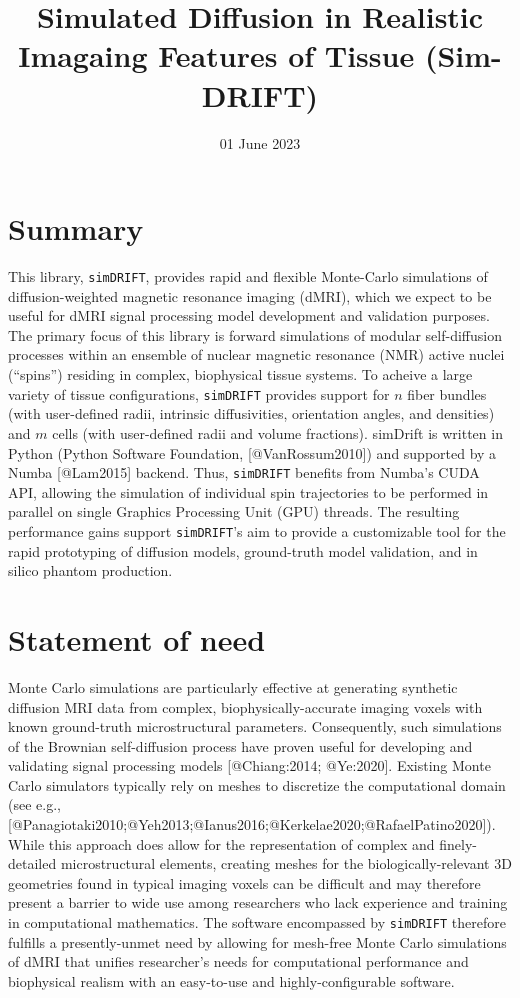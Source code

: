 \documentclass[
]{article}
\title{Simulated Diffusion in Realistic Imagaing Features of Tissue
(Sim-DRIFT)}
\author{}
\date{01 June 2023}
\begin{document}
\maketitle

\hypertarget{summary}{%
\section{Summary}\label{summary}}

This library, \texttt{simDRIFT}, provides rapid and flexible Monte-Carlo
simulations of diffusion-weighted magnetic resonance imaging (dMRI),
which we expect to be useful for dMRI signal processing model
development and validation purposes. The primary focus of this library
is forward simulations of modular self-diffusion processes within an
ensemble of nuclear magnetic resonance (NMR) active nuclei (``spins'')
residing in complex, biophysical tissue systems. To acheive a large
variety of tissue configurations, \texttt{simDRIFT} provides support for
\(n\) fiber bundles (with user-defined radii, intrinsic diffusivities,
orientation angles, and densities) and \(m\) cells (with user-defined
radii and volume fractions). simDrift is written in Python (Python
Software Foundation, {[}@VanRossum2010{]}) and supported by a Numba
{[}@Lam2015{]} backend. Thus, \texttt{simDRIFT} benefits from Numba's
CUDA API, allowing the simulation of individual spin trajectories to be
performed in parallel on single Graphics Processing Unit (GPU) threads.
The resulting performance gains support \texttt{simDRIFT}'s aim to
provide a customizable tool for the rapid prototyping of diffusion
models, ground-truth model validation, and in silico phantom production.

\hypertarget{statement-of-need}{%
\section{Statement of need}\label{statement-of-need}}

Monte Carlo simulations are particularly effective at generating
synthetic diffusion MRI data from complex, biophysically-accurate
imaging voxels with known ground-truth microstructural parameters.
Consequently, such simulations of the Brownian self-diffusion process
have proven useful for developing and validating signal processing
models {[}@Chiang:2014; @Ye:2020{]}. Existing Monte Carlo simulators
typically rely on meshes to discretize the computational domain (see
e.g.,
{[}@Panagiotaki2010;@Yeh2013;@Ianus2016;@Kerkelae2020;@RafaelPatino2020{]}).
While this approach does allow for the representation of complex and
finely-detailed microstructural elements, creating meshes for the
biologically-relevant 3D geometries found in typical imaging voxels can
be difficult and may therefore present a barrier to wide use among
researchers who lack experience and training in computational
mathematics. The software encompassed by \texttt{simDRIFT} therefore
fulfills a presently-unmet need by allowing for mesh-free Monte Carlo
simulations of dMRI that unifies researcher's needs for computational
performance and biophysical realism with an easy-to-use and
highly-configurable software.
\end{document}
